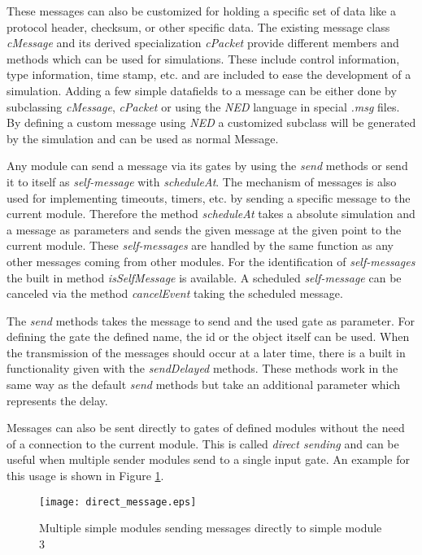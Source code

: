 These messages can also be customized for holding a specific set of data like a protocol header, checksum, or other specific data.
The existing message class \emph{cMessage} and its derived specialization \emph{cPacket} provide different members and methods which can be used for simulations.
These include control information, type information, time stamp, etc. and are included to ease the development of a simulation.
Adding a few simple datafields to a message can be either done by subclassing \emph{cMessage}, \emph{cPacket} or using the \emph{NED} language in special \emph{.msg} files.
By defining a custom message using \emph{NED} a customized subclass will be generated by the simulation and can be used as normal Message. \cite[chapter 6]{omnet_manual}

Any module can send a message via its gates by using the \emph{send} methods or send it to itself as \emph{self-message} with \emph{scheduleAt}.
The mechanism of messages is also used for implementing timeouts, timers, etc. by sending a specific message to the current module.
Therefore the method \emph{scheduleAt} takes a absolute simulation and a message as parameters and sends the given message at the given point to the current module.
These \emph{self-messages} are handled by the same function as any other messages coming from other modules.
For the identification of \emph{self-messages} the built in method \emph{isSelfMessage} is available.
A scheduled \emph{self-message} can be canceled via the method \emph{cancelEvent} taking the scheduled message. \cite[section 4.7.1]{omnet_manual}

The \emph{send} methods takes the message to send and the used gate as parameter.
For defining the gate the defined name, the id or the object itself can be used. \cite[section 4.7.2]{omnet_manual}
When the transmission of the messages should occur at a later time, there is a built in functionality given with the \emph{sendDelayed} methods.
These methods work in the same way as the default \emph{send} methods but take an additional parameter which represents the delay. \cite[section 4.7.6]{omnet_manual}

Messages can also be sent directly to gates of defined modules without the need of a connection to the current module.
This is called \emph{direct sending} and can be useful when multiple sender modules send to a single input gate.
An example for this usage is shown in Figure \ref{fig:direct_sending}.

\begin{figure}
        \centering
        \texttt{[image: direct\_message.eps]}
        \caption{Multiple simple modules sending messages directly to simple module 3}
        \label{fig:direct_sending}
\end{figure}

